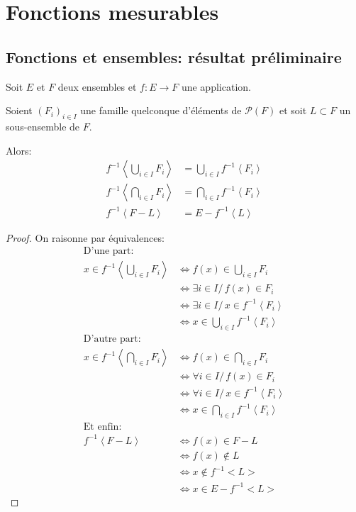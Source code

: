 %
%
%
%

\section{Fonctions mesurables}

\subsection{Fonctions et ensembles: résultat préliminaire}

\begin{prop}
Soit $E$ et $F$ deux ensembles et $f: E \to F$ une application.

Soient $\left(F_{i}\right)_{i \in I}$ une famille quelconque d'éléments de $\mathcal{P}(F)$ et soit $L \subset F$ un sous-ensemble de $F$.

Alors:
\begin{align*}
f^{-1}\left<\bigcup \limits_{i \in I} F_i \right> & = \bigcup \limits_{i \in I} f^{-1}\left< F_i \right> \\
f^{-1}\left<\bigcap \limits_{i \in I} F_i \right> & = \bigcap \limits_{i \in I} f^{-1}\left< F_i \right> \\
f^{-1}\left< F - L \right> & = E-f^{-1}\left< L \right>
\end{align*}
\end{prop}

\begin{proof}
On raisonne par équivalences:
\begin{align*}
\text{D'une part}:\\
x \in f^{-1}\left<\bigcup \limits_{i \in I} F_i \right> & \iff f(x) \in \bigcup \limits_{i \in I} F_i \\
 & \iff \exists i \in I/ \, f(x) \in F_i \\
 & \iff \exists i \in I/ \, x \in f^{-1}\left<F_i\right>\\
 & \iff x \in \bigcup \limits_{i \in I} f^{-1}\left< F_i \right> \\
\text{D'autre part}:\\
x \in f^{-1}\left<\bigcap \limits_{i \in I} F_i \right> & \iff f(x) \in \bigcap \limits_{i \in I} F_i \\
 & \iff \forall i \in I/ \, f(x) \in F_i \\
 & \iff \forall i \in I/ \, x \in f^{-1}\left<F_i\right>\\
 & \iff x \in \bigcap \limits_{i \in I} f^{-1}\left< F_i \right> \\
\text{Et enfin}:\\
f^{-1}\left< F - L \right> & \iff f(x) \in F-L \\
  & \iff f(x) \notin L\\
  & \iff x \notin f^{-1}<L> \\
  & \iff x \in E-f^{-1}<L>
\end{align*}

\end{proof}

